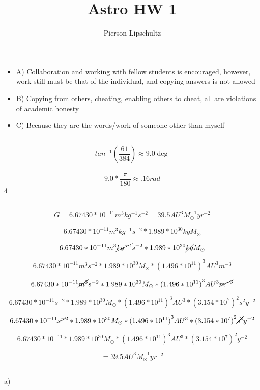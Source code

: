 \documentclass{article}
\title{Astro HW 1}
\author{Pierson Lipschultz}
\begin{document}
\maketitle
\section{}
\subsection{}
\begin{itemize}
    \item A) Collaboration and working with fellow students is encouraged, however, work still must be that of the individual, and copying answers is not allowed 
    \item B) Copying from others, cheating, enabling others to cheat, all are violations of academic honesty
    \item C) Because they are the words/work of someone other than myself
\end{itemize}
\subsection{}

\[tan^{-1}(\frac{61}{384}) \approx 9.0\deg\] \\
\[9.0 * \frac{\pi}{180} \approx .16rad\]4

\subsection{}

\[G = 6.67430 * 10^{-11} m^{3} kg^{-1} s^{-2} = 39.5 AU^{3} M_{\odot}^{-1} yr^{-2}\]

\[6.67430 * 10^{-11} m^{3} kg^{-1} s^{-2} * 1.989 * 10^{30}kg M_{\odot}\]

\[6.67430 * 10^{-11} m^{3} \cancel{kg^{-1}} s^{-2} * 1.989 * 10^{30}\cancel{kg} M_{\odot}\]

\[6.67430 * 10^{-11} m^{3} s^{-2} * 1.989 * 10^{30} M_{\odot} * {(1.496 * 10^{11})}^3 AU^3 m^{-3}\]

\[6.67430 * 10^{-11} \cancel{m^{3}} s^{-2} * 1.989 * 10^{30} M_{\odot} * {(1.496 * 10^{11})}^3 AU^3 \cancel{m^{-3}}\]

\[6.67430 * 10^{-11} s^{-2} * 1.989 * 10^{30} M_{\odot} * {(1.496 * 10^{11})}^3 AU^3 * {(3.154 * 10^7)}^2 s^{2} y^{-2}\] 

\[6.67430 * 10^{-11} \cancel{s^{-2}} * 1.989 * 10^{30} M_{\odot} * {(1.496 * 10^{11})}^3 AU^3 * {(3.154 * 10^7)}^2 \cancel{s^{2}} y^{-2}\] 

\[6.67430 * 10^{-11} * 1.989 * 10^{30} M_{\odot} * {(1.496 * 10^{11})}^3 AU^3 * {(3.154 * 10^7)}^2 y^{-2}\] 

\[ = 39.5 AU^{3} M_{\odot}^{-1} yr^{-2}\]

\subsection{}

a) 
\end{document}
